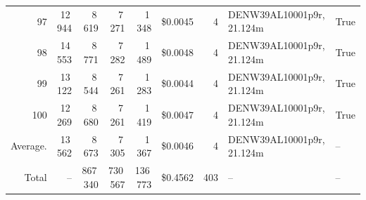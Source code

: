 \documentclass[a4paper,11pt]{article}
\begin{document}
\begin{table}[ht]
\begin{tabular}{r r r r r r r p{3cm} l}
97 & 12\,944 & 8\,619 & 7\,271 & 1\,348 & \$0.0045 & 4 & DENW39AL10001p9r, 21.124m & True \\
98 & 14\,553 & 8\,771 & 7\,282 & 1\,489 & \$0.0048 & 4 & DENW39AL10001p9r, 21.124m & True \\
99 & 13\,122 & 8\,544 & 7\,261 & 1\,283 & \$0.0044 & 4 & DENW39AL10001p9r, 21.124m & True \\
100 & 12\,269 & 8\,680 & 7\,261 & 1\,419 & \$0.0047 & 4 & DENW39AL10001p9r, 21.124m & True \\
\hline
Average. & 13\,562 & 8\,673 & 7\,305 & 1\,367 & \$0.0046 & 4 & DENW39AL10001p9r, 21.124m & -- \\
Total & -- & 867\,340 & 730\,567 & 136\,773 & \$0.4562 & 403 & -- & -- \\
\hline
\end{tabular}
\end{table}

\clearpage
\end{document}
